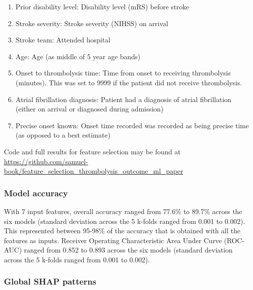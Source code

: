 \begin{enumerate}
    \item Prior disability level: Disability level (mRS) before stroke
    \item Stroke severity: Stroke severity (NIHSS) on arrival
    \item Stroke team: Attended hospital
    \item Age: Age (as middle of 5 year age bands)
    \item Onset to thrombolysis time: Time from onset to receiving thrombolysis (minutes). This was set to 9999 if the patient did not receive thrombolysis.
    \item Atrial fibrillation diagnosis: Patient had a diagnosis of atrial fibrillation (either on arrival or diagnosed during admission)
    \item Precise onset known: Onset time recorded was recorded as being precise time (as opposed to a best estimate)
\end{enumerate}

Code and full results for feature selection may be found at \url{https://github.com/samuel-book/feature_selection_thrombolysis_outcome_ml_paper}

\subsubsection{Model accuracy}

With 7 input features, overall accuracy ranged from 77.6\% to 89.7\% across the six models (standard deviation across the 5 k-folds ranged from 0.001 to 0.002). This represented between 95-98\% of the accuracy that is obtained with all the features as inputs. Receiver Operating Characteristic Area Under Curve (ROC-AUC) ranged from 0.852 to 0.893 across the six models (standard deviation across the 5 k-folds ranged from 0.001 to 0.002).

\subsubsection{Global SHAP patterns}

